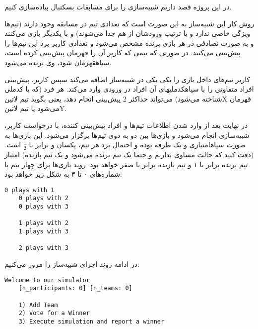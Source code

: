\documentclass[../main.tex]{subfiles}
\begin{document}


در این پروژه قصد داریم شبیه‌سازی را برای مسابقات بسکتبال پیاده‌سازی کنیم.


روش کار این شبیه‌ساز به این صورت است که تعدادی تیم در مسابقه وجود دارند (تیم‌ها ویژگی خاصی ندارد و با ترتیب ورودشان از هم جدا می‌شوند)
و با یکدیگر بازی می‌کنند و به صورت تصادفی در هر بازی برنده مشخص می‌شود و تعدادی کاربر برد این تیم‌ها را پیش‌بینی می‌کنند.
در صورتی که تیمی که کاربر آن را قهرمان پیش‌بینی کرده است، ‌سیاه{قهرمان} شود، وی برنده می‌شود.

کاربر تیم‌های داخل بازی را یکی یکی در شبیه‌ساز اضافه می‌کند
سپس کاربر، پیش‌بینی افراد متفاوتی را با ‌سیاه{کدملی}های آن افراد در ورودی وارد می‌کند.
هر فرد (که با کدملی شناخته می‌شود) می‌تواند حداکثر 2 پیش‌بینی انجام دهد،
یعنی بگوید تیم ‌لاتین{X} قهرمان می‌شود یا تیم ‌لاتین{Y}.

در نهایت بعد از وارد شدن اطلاعات تیم‌ها و افراد پیش‌بینی کننده، با درخواست کاربر، شبیه‌سازی انجام می‌شود و
بازی‌ها بین دو به دوی تیم‌ها برگزار می‌شود.
این بازی‌ها به صورت
‌سیاه{امتیازی و یک طرفه}
بوده و احتمال برد هر تیم‌، یکسان و برابر با
\(\frac{1}{2}\)
است. 
(دقت کنید که حالت مساوی نداریم و حتما یک تیم برنده می‌شود و یک تیم بازنده)
امتیاز تیم برنده برابر با ۱ و تیم بازنده برابر با صفر خواهد بود.
روند بازی‌ها برای چهار تیم با شماره‌های ۰ تا ۳ به شکل زیر خواهد بود:

\begin{latin}
\begin{lstlisting}[]
    0 plays with 1
    0 plays with 2
    0 plays with 3

    1 plays with 2
    1 plays with 3

    2 plays with 3
\end{lstlisting}
\end{latin}


در ادامه روند اجرای شبیه‌ساز را مرور می‌کنیم:

\begin{latin}
\begin{lstlisting}[]
    Welcome to our simulator
    [n_participants: 0] [n_teams: 0]

    1) Add Team
    2) Vote for a Winner
    3) Execute simulation and report a winner
\end{lstlisting}
\end{latin}
\end{document}
